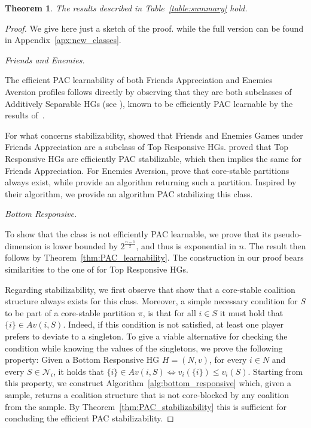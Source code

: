 \documentclass[letterpaper]{article} %
\makeatletter
\newtheorem{theorem}{Theorem}[section]
\newcommand{\set}[1]{\{#1\}}
\newcommand{\proofpart}[1]{%
  \par
  \addvspace{\smallskipamount}%
  \noindent\emph{#1} \hspace{2pt}
}
\newcommand{\SF}[1]{\textcolor{blue}{{ #1}}\marginpar{\raggedright\tiny \textcolor{blue}{Simone}}}
\makeatother
\begin{document}
\begin{theorem}\label{thm:new_classes}
The results described in
Table~\ref{table:summary} hold.
\end{theorem}
%
\begin{proof}
We give here just a sketch of the proof. 
while the full version can be found in Appendix~\ref{apx:new_classes}.
%
\proofpart{Friends and Enemies.}
The efficient PAC learnability of both Friends Appreciation and Enemies Aversion profiles follows directly by observing that they are both subclasses of Additively Separable HGs (see \cite{DimitrovBHS06}), known to be efficiently PAC learnable by the results of~\citet{SliwinskiZ17}.

For what concerns stabilizability, \citet{suzuki2010hedonic} showed that Friends and Enemies Games under Friends Appreciation are a subclass of Top Responsive HGs. \citet{SliwinskiZ17} proved that Top Responsive HGs are efficiently PAC stabilizable, which then implies the same for Friends Appreciation.
%
For Enemies Aversion, \citet{DimitrovBHS06} prove that core-stable partitions always exist, while \citet{DimitrovS04} provide an algorithm returning such a partition. Inspired by their algorithm, we provide an algorithm PAC stabilizing this class.

\proofpart{Bottom Responsive.}
To show that the class is not efficiently PAC learnable, we prove that its pseudo-dimension is lower bounded by $2^{\frac{n-1}{2}}$, and thus is exponential in $n$. The result then follows by Theorem~\ref{thm:PAC_learnability}. The construction in our proof bears similarities to the one of \citet{SliwinskiZ17} for Top Responsive HGs.

Regarding stabilizability, we first observe that \citet{suzuki2010hedonic} show that a core-stable coalition structure always exists for this class. Moreover, a simple necessary condition for $S$ to be part of a core-stable partition $\pi$, is that for all $i \in S$ it must hold that $\set{i} \in Av(i, S)$. Indeed, if this condition is not satisfied, at least one player prefers to deviate to a singleton. To give a viable alternative for checking the condition while knowing the values of the singletons, we prove the following property:
Given a Bottom Responsive HG $H=(N, v)$, for every $i\in N$ and every $S \in \mathcal{N}_i$, it holds that $
  \{ i \} \in Av(i, S) \iff  v_i(\set{i}) \leq v_i(S)$. 
Starting from this property, we construct Algorithm~\ref{alg:bottom_responsive} which, given a sample, returns a coalition structure that is not core-blocked by any coalition from the sample. By Theorem~\ref{thm:PAC_stabilizability} this is sufficient for concluding the efficient PAC stabilizability.


\end{proof}
\end{document}
